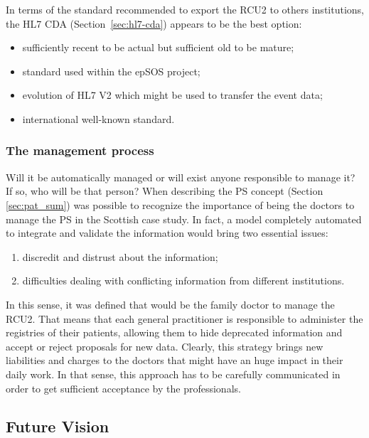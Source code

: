In terms of the standard recommended to export the RCU2 to others institutions, the HL7 CDA (Section~\ref{sec:hl7-cda}) appears to be the best option:
\begin{itemize}
\item sufficiently recent to be actual but sufficient old to be mature;
\item standard used within the epSOS project;
\item evolution of HL7 V2 which might be used to transfer the event data;
\item international well-known standard.
\end{itemize}

\subsubsection{The management process}

Will it be automatically managed or will exist anyone responsible to manage it? If so, who will be that person? When describing the PS concept (Section \ref{sec:pat_sum}) was possible to recognize the importance of being the doctors to manage the PS in the Scottish case study. In fact, a model completely automated to integrate and validate the information would bring two essential issues:
\begin{enumerate}
\item discredit and distrust about the information;
\item difficulties dealing with conflicting information from different institutions.
\end{enumerate}

In this sense, it was defined that would be the family doctor to manage the RCU2. That means that each general practitioner is responsible to administer the registries of their patients, allowing them to hide deprecated information and accept or reject proposals for new data. Clearly, this strategy brings new liabilities and charges to the doctors that might have an huge impact in their daily work. In that sense, this approach has to be carefully communicated in order to get sufficient acceptance by the professionals.









\subsection{Future Vision}

